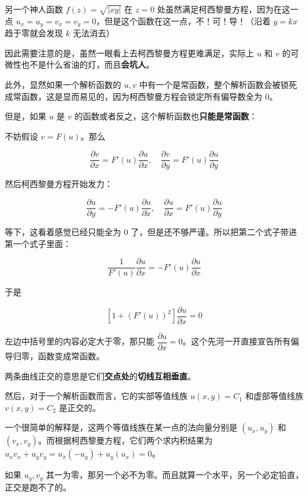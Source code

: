 \begin{tcolorbox}[title={例题引出的一些内容},colback=red!5!white
,colframe=red!75!black
,colbacktitle=yellow!50!red
,coltitle=red!25!black, fonttitle=\bfseries,subtitle style={boxrule=0.4pt, colback=yellow!50!red!25!white}]
另一个神人函数 \(f(z)=\sqrt{|xy|}\) 在
\(z=0\) 处虽然满足柯西黎曼方程，因为在这一点
\(u_x=u_y=v_x=v_y=0\)，但是这个函数在这一点，不！可！导！（沿着 \(y=kx\)
趋于零就会发现 \(k\) 无法消去）

因此需要注意的是，虽然一眼看上去柯西黎曼方程更难满足，实际上 \(u\) 和 \(v\) 的可微性也不是什么省油的灯，而且\textbf{会坑人}。

此外，显然如果一个解析函数的 \(u,v\) 中有一个是常函数，整个解析函数会被锁死成常函数，这是显而易见的，因为柯西黎曼方程会锁定所有偏导数全为 0。

但是，如果 \(u\) 是 \(v\) 的函数或者反之，这个解析函数也\textbf{只能是常函数}：

不妨假设 \(v=F(u)\)。那么

$$
\frac{\partial v}{\partial x}=F'(u)\frac{\partial u}{\partial x},\quad \frac{\partial v}{\partial y}=F'(u)\frac{\partial u}{\partial y}
$$

然后柯西黎曼方程开始发力：

$$
\frac{\partial u}{\partial y}=-F'(u)\frac{\partial u}{\partial x},\quad \frac{\partial u}{\partial x}=F'(u)\frac{\partial u}{\partial y}
$$

等下，这看着感觉已经只能全为 \(0\) 了，但是还不够严谨。所以把第二个式子带进第一个式子里面：

$$
\frac{1}{F'(u)} \frac{\partial u}{\partial x} = -F'(u) \frac{\partial u}{\partial x}
$$

于是

$$
\left[1 + (F'(u))^2\right] \frac{\partial u}{\partial x} = 0
$$

左边中括号里的内容必定大于零，那只能 \(\dfrac{\partial u}{\partial x}=0\)。这个先河一开直接宣告所有偏导归零，函数变成常函数。

\end{tcolorbox}

\begin{tcolorbox}[title={顺带一提的怪东西},colback=red!5!white
,colframe=red!75!black
,colbacktitle=yellow!50!red
,coltitle=red!25!black, fonttitle=\bfseries,subtitle style={boxrule=0.4pt, colback=yellow!50!red!25!white}]
两条曲线正交的意思是它们\textbf{交点处}的\textbf{切线互相垂直}。

然后，对于一个解析函数而言，它的实部等值线族 \(u(x,y)=C_1\) 和虚部等值线族 \(v(x,y)=C_2\) 是正交的。

一个很简单的解释是，这两个等值线族在某一点的法向量分别是 \((u_x,u_y)\) 和 \((v_x,v_y)\)。而根据柯西黎曼方程，它们两个求内积结果为 \(u_xv_x+u_yv_y=u_x(-u_y)+u_y(u_x)=0\)。

如果 \(u_y,v_y\) 其一为零，那另一个必不为零。而且就算一个水平，另一个必定铅直，正交是跑不了的。

\end{tcolorbox}

